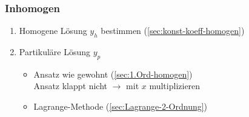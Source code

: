     \subsubsection{Inhomogen}
        \vspace{0.5em}
        \begin{enumerate}
            \item Homogene Lösung $y_h$ bestimmen (\ref{sec:konst-koeff-homogen})
            \item Partikuläre Lösung $y_p$
            \begin{itemize}
                \item Ansatz wie gewohnt (\ref{sec:1.Ord-homogen})\\
                      Ansatz klappt nicht $\to$ mit $x$ multiplizieren
                \item Lagrange-Methode (\ref{sec:Lagrange-2-Ordnung})
            \end{itemize}
        \end{enumerate}